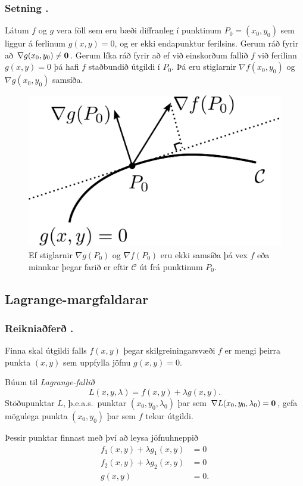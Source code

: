 \subsubsection{Setning \kaflanr.}
Látum $f$ og $g$ vera föll sem eru bæði
diffranleg í punktinum $P_0=(x_0,y_0)$ sem liggur á ferlinum
$g(x,y)=0$, og er ekki endapunktur ferilsins.  Gerum ráð fyrir að
$\nabla g(x_0,y_0)\neq \mbox{${\bf 0}$}$.  Gerum líka ráð fyrir að ef við einskorðum fallið $f$ við ferilinn $g(x,y)=0$ þá hafi $f$ staðbundið útgildi í $P_0$.  Þá eru stiglarnir $\nabla f(x_0,y_0)$ og $\nabla g(x_0,y_0)$ samsíða.


\begin {figure}[h!]
 \centering
            \includegraphics[width=.4\linewidth]{lagrange1}
            \caption*{Ef stiglarnir $\nabla g(P_0)$ og $\nabla f(P_0)$ eru ekki samsíða þá vex $f$ eða minnkar þegar farið er eftir $\mathcal{C}$ út frá punktinum $P_0$.}
\end {figure}



\subsection{Lagrange-margfaldarar} 

\subsubsection{Reikniaðferð \kaflanr.}
  Finna skal útgildi falls $f(x,y)$ þegar skilgreiningarsvæði $f$ er mengi þeirra punkta $(x,y)$ sem uppfylla jöfnu $g(x,y)=0$.  

\medskip
Búum til {\em Lagrange-fallið}
$$L(x,y,\lambda)=f(x,y)+\lambda g(x,y).$$
Stöðupunktar $L$, þ.e.a.s.~punktar $(x_0,y_0,\lambda_0)$ þar sem $\nabla L(x_0,y_0,\lambda_0)=\mbox{${\bf 0}$}$, gefa mögulega punkta $(x_0,y_0)$ þar sem $f$ tekur útgildi.

\medskip
Þessir punktar finnast með því að leysa jöfnuhneppið
\begin{align*}
f_1(x,y)+\lambda g_1(x,y)&=0\\
f_2(x,y)+\lambda g_2(x,y)&=0\\
g(x,y)&=0.
\end{align*}


